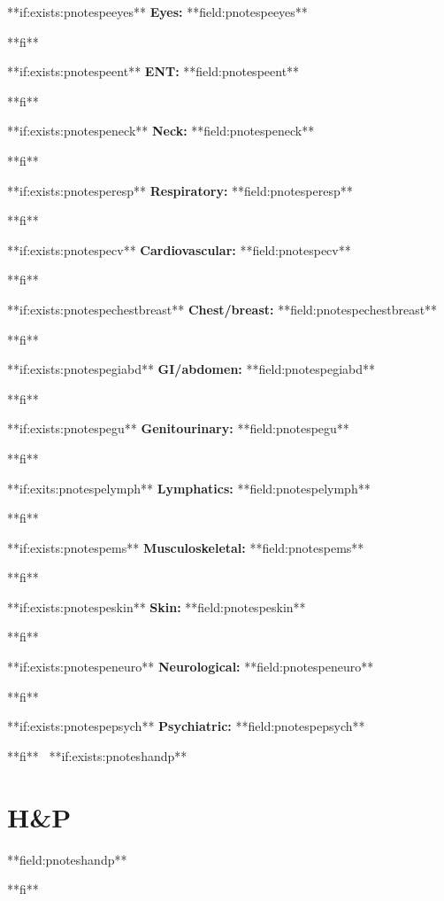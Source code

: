 \documentclass{article}
\newcommand{\sheading}[1]{\textbf{#1:}}
\begin{document}
**if:exists:pnotespeeyes**
\sheading{Eyes} **field:pnotespeeyes**
\par
**fi**

**if:exists:pnotespeent**
\sheading{ENT} **field:pnotespeent**
\par
**fi**

**if:exists:pnotespeneck**
\sheading{Neck} **field:pnotespeneck**
\par
**fi**

**if:exists:pnotesperesp**
\sheading{Respiratory} **field:pnotesperesp**
\par
**fi**

**if:exists:pnotespecv**
\sheading{Cardiovascular} **field:pnotespecv**
\par
**fi**

**if:exists:pnotespechestbreast**
\sheading{Chest/breast} **field:pnotespechestbreast**
\par
**fi**

**if:exists:pnotespegiabd**
\sheading{GI/abdomen} **field:pnotespegiabd**
\par
**fi**

**if:exists:pnotespegu**
\sheading{Genitourinary} **field:pnotespegu**
\par
**fi**

**if:exits:pnotespelymph**
\sheading{Lymphatics}  **field:pnotespelymph**
\par
**fi**


**if:exists:pnotespems**
\sheading{Musculoskeletal} **field:pnotespems**
\par
**fi**

**if:exists:pnotespeskin**
\sheading{Skin} **field:pnotespeskin**
\par
**fi**

**if:exists:pnotespeneuro**
\sheading{Neurological} **field:pnotespeneuro**
\par
**fi**

**if:exists:pnotespepsych**
\sheading{Psychiatric} **field:pnotespepsych**
\par
**fi**
\
**if:exists:pnoteshandp**
\section {H&P} **field:pnoteshandp**
\par
**fi**
\
\end{document}
